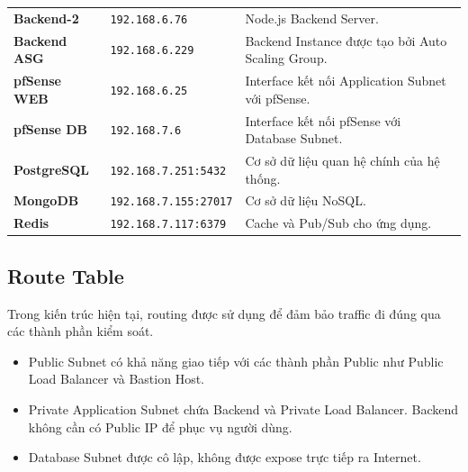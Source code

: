 \documentclass[12pt, a4paper]{article}
\begin{document}
\begin{table}[H]
\begin{tabularx}{\textwidth}{
        >{\raggedright\arraybackslash}p{3.2cm}
        >{\centering\arraybackslash}p{4.2cm}
        >{\raggedright\arraybackslash}X
    }
        \textbf{Backend-2} &
        \texttt{192.168.6.76} &
        Node.js Backend Server. \\

        \rowcolor{LightBlue}
        \textbf{Backend ASG} &
        \texttt{192.168.6.229} &
        Backend Instance được tạo bởi Auto Scaling Group. \\

        \textbf{pfSense WEB} &
        \texttt{192.168.6.25} &
        Interface kết nối Application Subnet với pfSense. \\

        \rowcolor{LightBlue}
        \textbf{pfSense DB} &
        \texttt{192.168.7.6} &
        Interface kết nối pfSense với Database Subnet. \\

        \textbf{PostgreSQL} &
        \texttt{192.168.7.251:5432} &
        Cơ sở dữ liệu quan hệ chính của hệ thống. \\

        \rowcolor{LightBlue}
        \textbf{MongoDB} &
        \texttt{192.168.7.155:27017} &
        Cơ sở dữ liệu NoSQL. \\

        \textbf{Redis} &
        \texttt{192.168.7.117:6379} &
        Cache và Pub/Sub cho ứng dụng. \\

        \bottomrule
    \end{tabularx}
\end{table}

\subsection{Route Table}

Trong kiến trúc hiện tại, routing được sử dụng để đảm bảo
traffic đi đúng qua các thành phần kiểm soát.

\begin{itemize}
    \item Public Subnet có khả năng giao tiếp với các thành phần Public như Public Load Balancer và Bastion Host. 
    
    \item Private Application Subnet chứa Backend và Private Load Balancer. Backend không cần có Public IP để phục vụ người dùng. 

    \item Database Subnet được cô lập, không được expose trực tiếp
    ra Internet.
\end{itemize}
\end{document}
